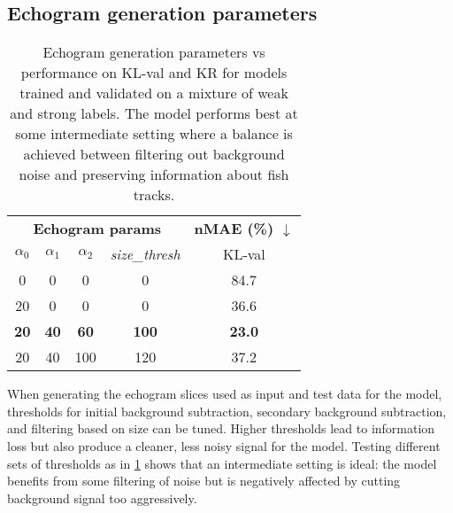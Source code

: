\subsection{Echogram generation parameters}

\vspace{-10pt}

\begin{table}[h]
    \centering
    \footnotesize
    \begin{tabular}{ccccc}
        \toprule
        \multicolumn{4}{c}{\textbf{Echogram params}} & \textbf{nMAE (\%) $\downarrow$} \\
        \cmidrule(lr){1-4} \cmidrule(lr){5-5}
        $\alpha_0$ & $\alpha_1$ & $\alpha_2$ & \textit{size\_thresh} & KL-val \\
        \midrule
        0 & 0 & 0 & 0 & 84.7 \\
        20 & 0 & 0 & 0 & 36.6 \\
        \textbf{20} & \textbf{40} & \textbf{60} & \textbf{100} & \textbf{23.0}  \\
        20 & 40 & 100 & 120 & 37.2 \\
        \bottomrule
    \end{tabular}
    \vspace{-5pt}
    \caption{\footnotesize Echogram generation parameters vs performance on KL-val and KR for models trained and validated on a mixture of weak and strong labels. The model performs best at some intermediate setting where a balance is achieved between filtering out background noise and preserving information about fish tracks.}
    \vspace{-5pt}
    \label{tab:echogram-params}
\end{table}

When generating the echogram slices used as input and test data for the model, thresholds for initial background subtraction, secondary background subtraction, and filtering based on size can be tuned. Higher thresholds lead to information loss but also produce a cleaner, less noisy signal for the model. Testing different sets of thresholds as in \cref{tab:echogram-params} shows that an intermediate setting is ideal: the model benefits from some filtering of noise but is negatively affected by cutting background signal too aggressively.

